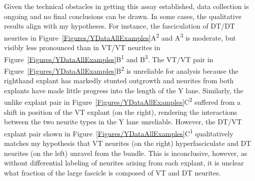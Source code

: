 Given the technical obstacles in getting this assay established, data collection is ongoing and no final conclusions can be drawn.
In some cases, the qualitative results align with my hypotheses.
For instance, the fasciculation of DT/DT neurites in Figure~\ref{Figures/YDataAllExamples}A\textsuperscript{2} and A\textsuperscript{3} is moderate, but visibly less pronounced than in VT/VT neurites in Figure~\ref{Figures/YDataAllExamples}B\textsuperscript{1} and B\textsuperscript{3}.
The VT/VT pair in Figure~\ref{Figures/YDataAllExamples}B\textsuperscript{2} is unreliable for analysis because the righthand explant has markedly stunted outgrowth and neurites from both explants have made little progress into the length of the Y lane.
Similarly, the unlike explant pair in Figure~\ref{Figures/YDataAllExamples}C\textsuperscript{2} suffered from a shift in position of the VT explant (on the right), rendering the interactions between the two neurite types in the Y lane unreliable.
However, the DT/VT explant pair shown in Figure~\ref{Figures/YDataAllExamples}C\textsuperscript{1} qualitatively matches my hypothesis that VT neurites (on the right) hyperfasciculate and DT neurites (on the left) unravel from the bundle.
This is inconclusive, however, as without differential labeling of neurites arising from each explant, it is unclear what fraction of the large fascicle is composed of VT and DT neurites.

